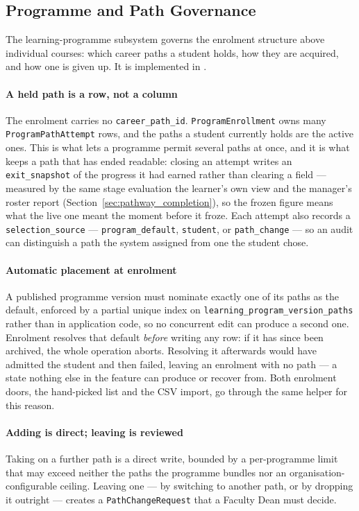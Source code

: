 \subsection{Programme and Path Governance}
\label{sec:impl_path_governance}

The learning-programme subsystem governs the enrolment structure above individual courses: which career paths a student holds, how they are acquired, and how one is given up. It is implemented in .

\paragraph{A held path is a row, not a column}
The enrolment carries no \texttt{career\_path\_id}. \texttt{ProgramEnrollment} owns many \texttt{ProgramPathAttempt} rows, and the paths a student currently holds are the active ones. This is what lets a programme permit several paths at once, and it is what keeps a path that has ended readable: closing an attempt writes an \texttt{exit\_snapshot} of the progress it had earned rather than clearing a field --- measured by the same stage evaluation the learner's own view and the manager's roster report (Section~\ref{sec:pathway_completion}), so the frozen figure means what the live one meant the moment before it froze. Each attempt also records a \texttt{selection\_source} --- \texttt{program\_default}, \texttt{student}, or \texttt{path\_change} --- so an audit can distinguish a path the system assigned from one the student chose.

\paragraph{Automatic placement at enrolment}
A published programme version must nominate exactly one of its paths as the default, enforced by a partial unique index on \texttt{learning\_program\_version\_paths} rather than in application code, so no concurrent edit can produce a second one. Enrolment resolves that default \emph{before} writing any row: if it has since been archived, the whole operation aborts. Resolving it afterwards would have admitted the student and then failed, leaving an enrolment with no path --- a state nothing else in the feature can produce or recover from. Both enrolment doors, the hand-picked list and the CSV import, go through the same helper for this reason.

\paragraph{Adding is direct; leaving is reviewed}
Taking on a further path is a direct write, bounded by a per-programme limit that may exceed neither the paths the programme bundles nor an organisation-configurable ceiling. Leaving one --- by switching to another path, or by dropping it outright --- creates a \texttt{PathChangeRequest} that a Faculty Dean must decide.

